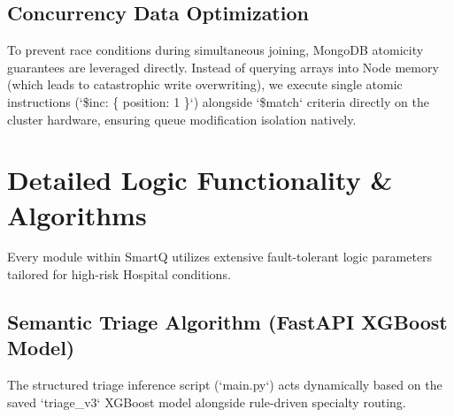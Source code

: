 \documentclass[12pt,a4paper]{article}
\begin{document}
\subsection{Concurrency Data Optimization}
To prevent race conditions during simultaneous joining, MongoDB atomicity guarantees are leveraged directly. Instead of querying arrays into Node memory (which leads to catastrophic write overwriting), we execute single atomic instructions (`\$inc: \{ position: 1 \}`) alongside `\$match` criteria directly on the cluster hardware, ensuring queue modification isolation natively.

\section{Detailed Logic Functionality \& Algorithms}

Every module within SmartQ utilizes extensive fault-tolerant logic parameters tailored for high-risk Hospital conditions.

\subsection{Semantic Triage Algorithm (FastAPI XGBoost Model)}

The structured triage inference script (`main.py`) acts dynamically based on the saved `triage_v3` XGBoost model alongside rule-driven specialty routing.
\end{document}
